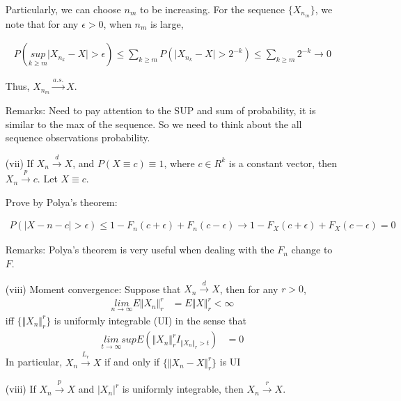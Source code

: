 \begin{itemize}
 Particularly, we can choose $n_m$ to be increasing. For the sequence $\{ X_{n_m} \}$, we note that for any $\epsilon > 0$, when $n_m$ is large,
 
 \begin{align*}
   P(\underset{k \geq m}{sup} \Big | X_{n_k}- X \Big | > \epsilon) \leq \underset{k \geq m}{\sum} P(\Big | X_{n_k}- X \Big | > 2^{-k}) \leq \underset{k \geq m}{\sum} 2^{-k} \rightarrow 0
 \end{align*}
 
 Thus, $X_{n_m} \xrightarrow {a.s.} X$.
 
 Remarks: Need to pay attention to the SUP and sum of probability, it is similar to the max of the sequence. So we need to think about the all sequence observations probability.
 
\item[(vii)]  If $X_n \xrightarrow {d} X$, and $P(X \equiv c) \equiv 1$, where $c \in R^k$ is a constant vector, then $X_n \xrightarrow {p} c$.
Let $X \equiv c$. 

Prove by Polya's theorem:

 \begin{align*}
 P(\Big | X-n -c \Big | > \epsilon) \leq 1- F_n(c + \epsilon) + F_n(c - \epsilon) \rightarrow 1 - F_X(c+\epsilon) + F_X(c - \epsilon) = 0
 \end{align*}

Remarks:  Polya's theorem is very useful when dealing with the $F_n$ change to $F$. 

\item[(viii)] Moment convergence: Suppose that $X_n \xrightarrow {d} X$, then for any $r > 0$, 
 \begin{align*}
   \underset{n \rightarrow \infty}{lim} E \Vert X_n \Vert_r^r &= E \Vert X \Vert_r^r < \infty
 \end{align*}
iff $\{ \Vert X_n \Vert_r^r \}$ is uniformly integrable (UI) in the sense that 
 \begin{align*}
   \underset{t \rightarrow \infty}{lim} sup E (\Vert X_n \Vert_r^r  I_{\Vert X_n \Vert_r > t})&= 0
 \end{align*}
In particular, $X_n \xrightarrow {L_r} X$ if and only if $\{ \Vert X_n - X\Vert_r^r \}$ is UI

\item[(viii)] If $X_n \xrightarrow {p} X$ and $|X_n|^r$ is uniformly integrable, then $X_n \xrightarrow {r} X$. 

\end{itemize}

